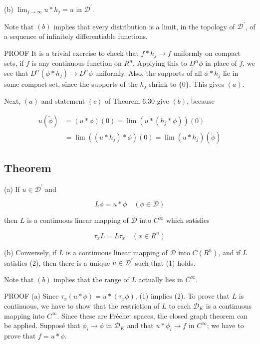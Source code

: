 \documentclass[10pt]{article}
\begin{document}
(b) $\lim _{j \rightarrow \infty} u * h_{j}=u$ in $\mathscr{D}^{\prime}$.

Note that $(b)$ implies that every distribution is a limit, in the topology of $\mathscr{D}^{\prime}$, of a sequence of infinitely differentiable functions.

PROOF It is a trivial exercise to check that $f * h_{j} \rightarrow f$ uniformly on compact sets, if $f$ is any continuous function on $R^{n}$. Applying this to $D^{\alpha} \phi$ in place of $f$, we see that $D^{\alpha}\left(\phi * h_{j}\right) \rightarrow D^{\alpha} \phi$ uniformly. Also, the supports of all $\phi * h_{j}$ lie in some compact set, since the supports of the $h_{j}$ shrink to $\{0\}$. This gives $(a)$.

Next, $(a)$ and statement $(c)$ of Theorem 6.30 give $(b)$, because

$$
\begin{aligned}
u(\check{\phi}) & =(u * \phi)(0)=\lim \left(u *\left(h_{j} * \phi\right)\right)(0) \\
& =\lim \left(\left(u * h_{j}\right) * \phi\right)(0)=\lim \left(u * h_{j}\right)(\check{\phi})
\end{aligned}
$$

\subsection{Theorem}
(a) If $u \in \mathscr{D}^{\prime}$ and

$$
L \phi=u * \phi \quad(\phi \in \mathscr{D})
$$

then $L$ is a continuous linear mapping of $\mathscr{D}$ into $C^{\infty}$ which satisfies

$$
\tau_{x} L=L \tau_{x} \quad\left(x \in R^{n}\right)
$$

(b) Conversely, if $L$ is a continuous linear mapping of $\mathscr{D}$ into $C\left(R^{n}\right)$, and if $L$ satisfies (2), then there is a unique $u \in \mathscr{D}^{\prime}$ such that (1) holds.

Note that $(b)$ implies that the range of $L$ actually lies in $C^{\infty}$.

PROOF (a) Since $\tau_{x}(u * \phi)=u *\left(\tau_{x} \phi\right)$, (1) implies (2). To prove that $L$ is continuous, we have to show that the restriction of $L$ to each $\mathscr{D}_{K}$ is a continuous mapping into $C^{\infty}$. Since these are Fréchet spaces, the closed graph theorem can be applied. Supposé that $\phi_{i} \rightarrow \phi$ in $\mathscr{D}_{K}$ and that $u * \phi_{i} \rightarrow f$ in $C^{\infty}$; we have to prove that $f=u * \phi$.
\end{document}
